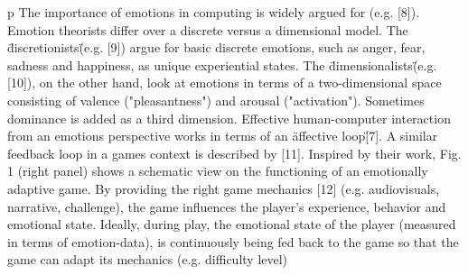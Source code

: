 p The importance of emotions in computing is widely argued for (e.g. [8]). Emotion theorists differ over a discrete versus a dimensional model. The \"discretionists\" (e.g. [9]) argue for basic discrete emotions, such as anger, fear, sadness and happiness, as unique experiential states. The \"dimensionalists\" (e.g. [10]), on the other hand, look at emotions in terms of a two-dimensional space consisting of valence ("pleasantness") and arousal ("activation"). Sometimes dominance is added as a third dimension. Effective human-computer interaction from an emotions perspective works in terms of an \"affective loop\" [7]. A similar feedback loop in a games context is described by [11]. Inspired by their work, Fig. 1 (right panel) shows a schematic view on the functioning of an emotionally adaptive game. By providing the right game mechanics [12] (e.g. audiovisuals, narrative, challenge), the game influences the player's experience, behavior and emotional state. Ideally, during play, the emotional state of the player (measured in terms of emotion-data), is continuously being fed back to the game so that the game can adapt its mechanics (e.g. difficulty level)
